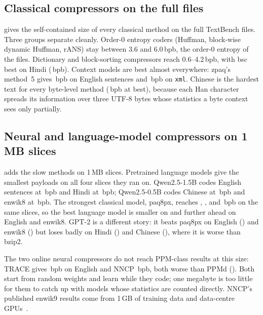 \subsection{Classical compressors on the full files}
 gives the self-contained size of every classical method on the full TextBench files. Three groups separate cleanly. Order-0 entropy coders (Huffman, block-wise dynamic Huffman, rANS) stay between 3.6 and 6.0\,bpb, the order-0 entropy of the files. Dictionary and block-sorting compressors reach 0.6--4.2\,bpb, with bsc best on Hindi (\NumFBscHi{}\,bpb). Context models are best almost everywhere: zpaq's method~5 gives \NumFZpaqEn{}\,bpb on English sentences and \NumFZpaqXml{}\,bpb on \texttt{xml}. Chinese is the hardest text for every byte-level method (\NumFZpaqZh{}\,bpb at best), because each Han character spreads its information over three UTF-8 bytes whose statistics a byte context sees only partially.



\subsection{Neural and language-model compressors on 1\,MB slices}
 adds the slow methods on 1\,MB slices. Pretrained language models give the smallest payloads on all four slices they ran on. Qwen2.5-1.5B codes English sentences at \NumSQlEn{}\,bpb and Hindi at \NumSQlHi{}\,bpb; Qwen2.5-0.5B codes Chinese at \NumSQsZh{}\,bpb and enwik8 at \NumSQsWk{}\,bpb. The strongest classical model, paq8px, reaches \NumSPaqEn{}, \NumSPaqHi{}, \NumSPaqZh{} and \NumSPaqWk{}\,bpb on the same slices, so the best language model is \NumBestLLMgain{} smaller on \NumBestLLMfile{} and further ahead on English and enwik8. GPT-2 is a different story: it beats paq8px on English (\NumSGptEn{}) and enwik8 (\NumSGptWk{}) but loses badly on Hindi (\NumSGptHi{}) and Chinese (\NumSGptZh{}), where it is worse than bzip2.

The two online neural compressors do not reach PPM-class results at this size: TRACE gives \NumSTraceEn{}\,bpb on English and NNCP \NumSNncpEn{}\,bpb, both worse than PPMd (\NumSPpmdEn{}). Both start from random weights and learn while they code; one megabyte is too little for them to catch up with models whose statistics are counted directly. NNCP's published enwik9 results come from 1\,GB of training data and data-centre GPUs~\cite{bellard2021nncpv2}.



